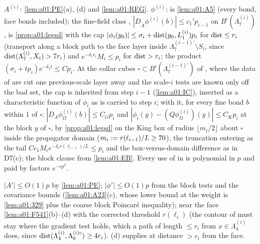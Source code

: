 \begin{description}[leftmargin=1.5em,style=nextline]
\item[{D8 (the backgrounds in the regular and fine-field classes; \cite[Lemmas~2.3--2.4, Prop.~2.2]{Ba2})}] $A^{(i)}$: \cref{lem:a01:PE}(a), (d) and \cref{lem:a01:REG}. $\phi^{(i)}$: \cite[Prop.~2.2]{Ba2} is \cref{lem:a01:A5} (every bond, face bonds included); the fine-field class \cite[(2.55)]{Ba2}, $|D_{\tilde A}\phi^{(i)}(b)|\le c_1'p_{i-1}$ on $B^i(\Lambda_7^{(i)})$, is \cref{prop:a01:legsd} with the cap $|\phi_i(y_0)|\le\sigma_i+\operatorname{dist}(y_0,L_{1}^{(i)})p_i$ for $\operatorname{dist}\le r_i$ (transport along a block path to the face layer inside $\Lambda_7^{(i-1)\prime}\setminus S_i$, since $\operatorname{dist}(\Lambda_7^{(i)},X_i)>7r_i$) and $e^{-\delta_1r_i}M_i\le p_i$ for $\operatorname{dist}>r_i$; the product $(\sigma_i+tp_i)e^{-\delta_1t}\le Cp_i$. At the collar cubes $\square\subset B^i(\Lambda_7^{(i-1)\prime})$ of \cite[Prop.~2.1]{Ba2}, where the data of \cite[(2.56)]{Ba2} are cut one previous-scale layer away and the scale-$i$ tests are known only off the bad set, the cap is inherited from step $i-1$ (\cref{lem:a01:IC}), inserted as a characteristic function of $\phi_i$ as \cite[(2.55)]{Ba2} is carried to step $i$; with it, for every fine bond $b$ within $1$ of $\square$: $|D_A\phi^{(i)}_\Omega(b)|\le C_Gp_i$ and $|\phi_i(y)-(Q\phi^{(i)}_\Omega)(y)|\le C_Kp_i$ at the block $y$ of $\square$, by \cref{prop:a01:legsd} on the King box of radius $\lfloor m_i/2\rfloor$ about $\square$ inside the propagator domain ($m_i:= r(\ell_{i-1})/L\ge70$), the truncation entering as the tail $Cc_1M_ie^{-\delta_cr(\ell_{i-1})/L}\le p_i$ and the box-versus-domain difference as in D7(c); the block clause from \cref{lem:a01:EB}. Every use of \cite[(2.55)]{Ba2} in \cite{Ba2} is polynomial in $p$ and paid by factors $e^{-cp^2}$.
\item[{D9 (fluctuation fields small; \cite[Lemmas~2.5, 2.7]{Ba2})}] $|A'|\le O(1)p$ \cite[(2.86)]{Ba2} by \cref{lem:a01:PE}; $|\phi'|\le O(1)p$ \cite[(2.114)]{Ba2} from the block tests and the covariance bounds (\cref{lem:a01:A23}(c), whose lower bound at the weight is \cref{lem:a01:329} plus the coarse block Poincar\'e inequality); near the face \cref{lem:a01:F541}(b)--(d) with the corrected threshold $r(\ell_i)$ (the contour of \cite[(5.44)]{K2} must stay where the gradient test holds, which a path of length $\le r_i$ from $x\in\Lambda_4^{(i)}$ does, since $\operatorname{dist}(\Lambda_4^{(i)},\Lambda_0^{(i)c})\ge4r_i$). (d) supplies \cite[(2.113)]{Ba2} at distance $>r_i$ from the face.

\end{description}
